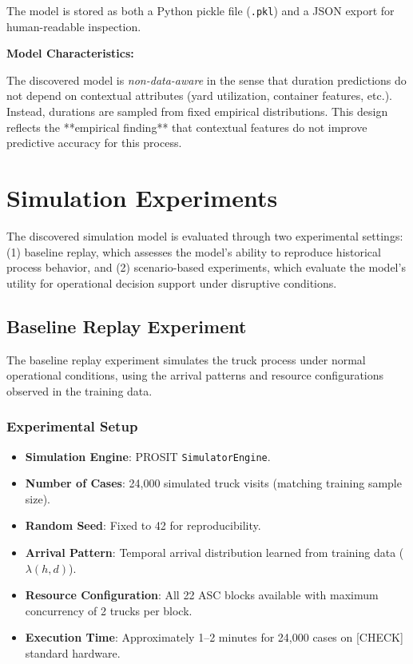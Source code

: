     The model is stored as both a Python pickle file (\texttt{.pkl}) and a JSON export for human-readable inspection.
    
    \textbf{Model Characteristics:}
    
    The discovered model is \textit{non-data-aware} in the sense that duration predictions do not depend on contextual attributes (yard utilization, container features, etc.). Instead, durations are sampled from fixed empirical distributions. This design reflects the **empirical finding** that contextual features do not improve predictive accuracy for this process.

\section{Simulation Experiments}

The discovered simulation model is evaluated through two experimental settings: (1) baseline replay, which assesses the model's ability to reproduce historical process behavior, and (2) scenario-based experiments, which evaluate the model's utility for operational decision support under disruptive conditions.

\subsection{Baseline Replay Experiment}

The baseline replay experiment simulates the truck process under normal operational conditions, using the arrival patterns and resource configurations observed in the training data.

        \subsubsection{Experimental Setup}
        
        \begin{itemize}
            \item \textbf{Simulation Engine}: PROSIT \texttt{SimulatorEngine}.
            \item \textbf{Number of Cases}: 24,000 simulated truck visits (matching training sample size).
            \item \textbf{Random Seed}: Fixed to 42 for reproducibility.
            \item \textbf{Arrival Pattern}: Temporal arrival distribution learned from training data ($\lambda(h, d)$).
            \item \textbf{Resource Configuration}: All 22 ASC blocks available with maximum concurrency of 2 trucks per block.
            \item \textbf{Execution Time}: Approximately 1--2 minutes for 24,000 cases on [CHECK] standard hardware.
        \end{itemize}


